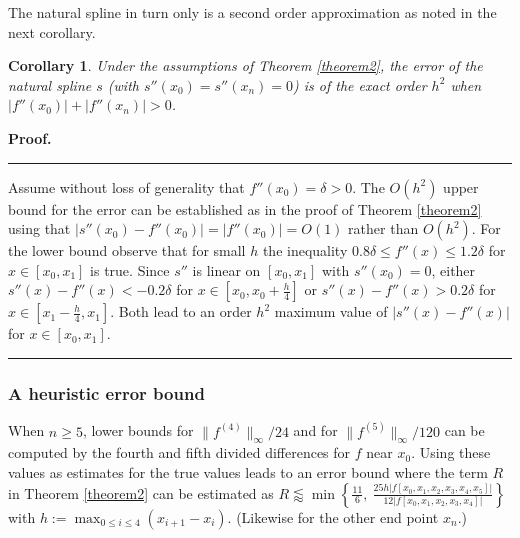 \documentclass[12pt]{article}
\newtheorem{corollary}{Corollary}
\newenvironment{proof}{\begin{list}{$\!\!${\bf Proof.}%
  \rule{1pt}{0pt}}{\setlength{\leftmargin}{0pt}%
  \setlength{\itemindent}{30pt}%
  \setlength{\listparindent}{15pt}}\item}{\rule{0.3em}{0mm}%
  \hfill\framebox[1.2ex]{\rule{0.3em}{0mm}}\end{list}}
\begin{document}
The natural spline in turn only is a second order approximation
as noted in the next corollary.

\begin{corollary}\label{corollary1}
  Under the assumptions of Theorem \ref{theorem2}, the error of the
  natural spline $s$ (with $s''(x_0)=s''(x_n)=0$) is of the exact order
  $h^2$ when $|f''(x_0)|+|f''(x_n)|>0$.
\end{corollary}
\begin{proof}
  Assume without loss of generality that $f''(x_0)=\delta >0$.
  The $O(h^2)$ upper bound for the error can be established
  as in the proof of Theorem \ref{theorem2} using that 
  $|s''(x_0)-f''(x_0)| = |f''(x_0)| = O(1)$ rather than $O(h^2)$.
  For the lower bound observe that for small $h$ the inequality
  $0.8\delta \le f''(x) \le 1.2 \delta$ for $x\in[x_0,x_1]$
  is true. Since $s''$ is linear on $[x_0,x_1]$ with $s''(x_0)=0$,
  either $s''(x)-f''(x) < -0.2 \delta$ for $x\in [x_0,x_0+\frac h4]$
  or $s''(x)-f''(x) > 0.2 \delta$ for $x\in [x_1-\frac h4,x_1]$.
  Both lead to an order $h^2$ maximum value of $|s''(x)-f''(x)|$
  for $x\in[x_0,x_1]$.
\end{proof}





\subsubsection{A heuristic error bound}\label{sec.heur}

When $n\ge 5$, lower bounds for $\|f^{(4)}\|_\infty/24$ and for
$\|f^{(5)}\|_\infty/120$
can be computed by the fourth and fifth divided differences for $f$
near $x_0$.
Using these values as estimates for the true values 
leads to an error bound where the term $R$ in Theorem \ref{theorem2}
can be estimated as
$R\lessapprox\min\left\{\tfrac{11}6,\ \tfrac%
  {25h | f[x_0,x_1,x_2,x_3,x_4,x_5] | }{12|f[x_0,x_1,x_2,x_3,x_4]|}\right\}$
with
$h:=\max_{0\le i\le 4}(x_{i+1}-x_i)$. (Likewise for the other end point $x_n$.)


\end{document}
